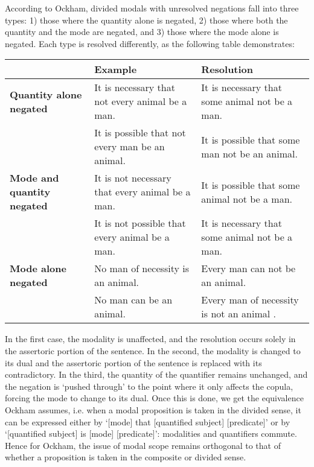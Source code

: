 	According to Ockham, divided modals with unresolved negations fall into three types: 1) those where the quantity alone is negated, 2) those where both the quantity and the mode are negated, and 3) those where the mode alone is negated. Each type is resolved differently, as the following table demonstrates:
	\begin{center}
		\begin{tabular}{|p{3cm}|p{4cm}|p{4cm}|}
			\hline & \textbf{Example} & \textbf{Resolution}  \\
			\hline \textbf{Quantity alone negated}  & It is necessary that not every animal be a man. & It is necessary that some animal not be a man. \\
			& It is possible that not every man be an animal. & It is possible that some man not be an animal. \\ \hline 
			\textbf{Mode and quantity negated} & It is not necessary that every animal be a man. & It is possible that some animal not be a man. \\
			& It is not possible that every animal be a man. & It is necessary that some animal not be a man. \\ \hline 
			\textbf{Mode alone negated} & No man of necessity is an animal. & Every man can not be an animal. \\
			& No man can be an animal. & Every man of necessity is not an animal \cite[III-3. 14, pp. 644-646]{OckhamSL}. \\ \hline
		\end{tabular}
	\end{center}
	\bigskip
	
	In the first case, the modality is unaffected, and the resolution occurs solely in the assertoric portion of the sentence. In the second, the modality is changed to its dual and the assertoric portion of the sentence is replaced with its contradictory. In the third, the quantity of the quantifier remains unchanged, and the negation is `pushed through' to the point where it only affects the copula, forcing the mode to change to its dual. Once this is done, we get the equivalence Ockham assumes, i.e.  when a modal proposition is taken in the divided sense, it can be expressed either by `[mode] that [quantified subject] [predicate]' or by `[quantified subject] is [mode] [predicate]': modalities and quantifiers commute. Hence for Ockham, the issue of modal scope remains orthogonal to that of whether a proposition is taken in the composite or divided sense.
